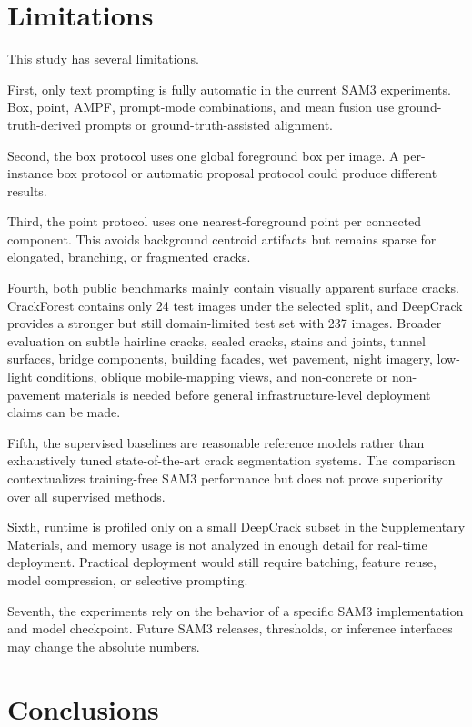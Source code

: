 \documentclass[applsci,article,submit,pdftex,moreauthors]{Definitions/mdpi}
\begin{document}
\section{Limitations}

This study has several limitations.

First, only text prompting is fully automatic in the current SAM3
experiments. Box, point, AMPF, prompt-mode combinations, and mean fusion
use ground-truth-derived prompts or ground-truth-assisted alignment.

Second, the box protocol uses one global foreground box per image. A
per-instance box protocol or automatic proposal protocol could produce
different results.

Third, the point protocol uses one nearest-foreground point per
connected component. This avoids background centroid artifacts but
remains sparse for elongated, branching, or fragmented cracks.

Fourth, both public benchmarks mainly contain visually apparent surface
cracks. CrackForest contains only 24 test images under the selected
split, and DeepCrack provides a stronger but still domain-limited test
set with 237 images. Broader evaluation on subtle hairline cracks,
sealed cracks, stains and joints, tunnel surfaces, bridge components,
building facades, wet pavement, night imagery, low-light conditions,
oblique mobile-mapping views, and non-concrete or non-pavement materials
is needed before general infrastructure-level deployment claims can be
made.

Fifth, the supervised baselines are reasonable reference models rather
than exhaustively tuned state-of-the-art crack segmentation systems. The
comparison contextualizes training-free SAM3 performance but does not
prove superiority over all supervised methods.

Sixth, runtime is profiled only on a small DeepCrack subset in the
Supplementary Materials, and memory usage is not analyzed in enough
detail for real-time deployment. Practical deployment would still
require batching, feature reuse, model compression, or selective
prompting.

Seventh, the experiments rely on the behavior of a specific SAM3
implementation and model checkpoint. Future SAM3 releases, thresholds,
or inference interfaces may change the absolute numbers.

\section{Conclusions}
\end{document}
